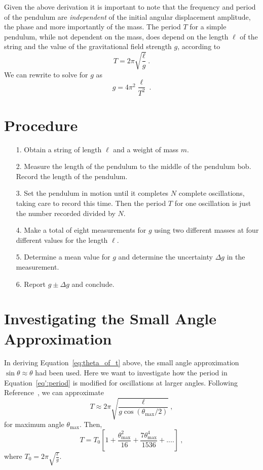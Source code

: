 \documentclass[10pt,aps,twocolumn,secnumarabic,balancelastpage,amsmath,amssymb,nofootinbib,floatfix]{revtex4}
\begin{document}
Given the above derivation it is important to note that the frequency and period of the pendulum are {\it independent} of the initial angular displacement amplitude, the phase and more importantly of the mass. The period $T$ for a simple pendulum, while not dependent on the mass, does depend on the length $\ell$ of the string and the value of the gravitational field strength $g$, according to
\begin{equation}\label{eq:period}
  T = 2 \pi \sqrt{\frac{\ell}{g}} \ .
\end{equation}
We can rewrite to solve for $g$ as
\begin{equation}
  g = 4 \pi^2 \frac{\ell}{T^2} \ .
\end{equation}

\section{Procedure}

\begin{itemize}
\item[1.] Obtain a string of length $\ell$ and a weight of mass $m$.
\item[2.] Measure the length of the pendulum to the middle of the pendulum bob.  Record the length of the pendulum.
\item[3.] Set the pendulum in motion until it completes $N$ complete oscillations, taking care to record this time. Then the period $T$ for one oscillation is just the number recorded divided by $N$.
\item[4.] Make a total of eight measurements for $g$ using two different masses at four different values for the length $\ell$.
\item[5.] Determine a mean value for $g$ and determine the uncertainty $\Delta g$ in the measurement.
\item[6.] Report $g \pm \Delta g$ and conclude.
\end{itemize}

\section{Investigating the Small Angle Approximation}

In deriving Equation~\ref{eq:theta_of_t} above, the small angle approximation $\sin\theta \approx \theta$ had been used. Here we want to investigate how the period in Equation~\ref{eq':period} is modified for oscillations at larger angles. Following Reference~\cite{cite:kidd-fogg}, we can approximate
\begin{equation} \label{eq:period-larger}
  T \approx 2 \pi \sqrt{\frac{\ell}{g \cos (\theta_\text{max}/2)}} \ ,
\end{equation}
for maximum angle $\theta_\text{max}$. Then,
\begin{equation}
  T = T_0 \left[ 1 + \frac{\theta_\text{max}^2}{16} + \frac{7 \theta_\text{max}^4}{1536} + .... \right] \ ,
\end{equation}
where $T_0 = 2 \pi \sqrt{\frac{\ell}{g}}$.
\end{document}
